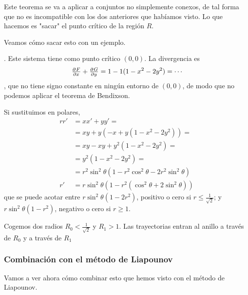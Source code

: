 Este teorema se va a aplicar a conjuntos no simplemente conexos, de tal forma que no es incompatible con los dos anteriores que habíamos visto. Lo que hacemos es "sacar" el punto crítico de la región $R$.

Veamos cómo sacar esto con un ejemplo.

\begin{example}
. Este sistema tiene como punto crítico $(0,0)$. La divergencia es \[ \pd{F}{x} + \pd{G}{y} = 1 - 1(1-x^2-2y^2) = \cdots \], que no tiene signo constante en ningún entorno de $(0,0)$, de modo que no podemos aplicar el teorema de Bendixson.

Si sustituimos en polares, \begin{align*} rr' &= xx' + yy' = \\ &= xy + y(-x+y(1-x^2-2y^2)) = \\ &= xy-xy + y^2(1-x^2-2y^2) = \\ &= y^2(1-x^2-2y^2) = \\ &=
r^2\sin^2 θ (1-r^2\cos^2 θ -2r^2\sin^2 θ) \\
r' &= r\sin^2 θ(1-r^2(\cos^2θ + 2\sin^2θ )) \end{align*} que se puede acotar entre $r\sin^2 θ (1-2r^2)$, positivo o cero si $r ≤ \frac{1}{\sqrt{2}}$; y $r\sin^2θ (1-r^2)$, negativo o cero si $r≥ 1$.

Cogemos dos radios $R_0 < \frac{1}{\sqrt{2}}$ y $R_1 > 1$. Las trayectorias entran al anillo a través de $R_0$ y a través de $R_1$
\end{example}

\subsubsection{Combinación con el método de Liapounov}

Vamos a ver ahora cómo combinar esto que hemos visto con el método de Liapounov.

